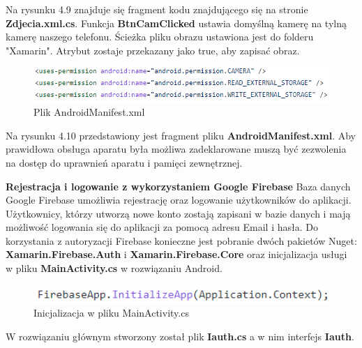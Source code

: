 Na rysunku 4.9 znajduje się fragment kodu znajdującego się na stronie \textbf{Zdjecia.xml.cs}. Funkcja \textbf{BtnCamClicked} ustawia domyślną kamerę na tylną kamerę naszego telefonu. Ścieżka pliku obrazu ustawiona jest do folderu "Xamarin". Atrybut zostaje przekazany jako true, aby zapisać obraz.
  
\begin{figure}[!htb]
	\begin{center}
		\includegraphics[width=12cm]{rys/Zdjecia_manifest.png}
		\caption{Plik AndroidManifest.xml}
		\label{rys:rysunek021}
	\end{center}
\end{figure}  

Na rysunku 4.10 przedstawiony jest fragment pliku \textbf{AndroidManifest.xml}. Aby prawidłowa obsługa aparatu była możliwa zadeklarowane muszą być zezwolenia na dostęp do uprawnień aparatu i pamięci zewnętrznej. \newline \newline

\textbf{Rejestracja i logowanie z wykorzystaniem Google Firebase} \newline
Baza danych Google Firebase umożliwia rejestrację oraz logowanie użytkowników do aplikacji. Użytkownicy, którzy utworzą nowe konto zostają zapisani w bazie danych i mają możliwość logowania się do aplikacji za pomocą adresu Email i hasła. \newline
Do korzystania z autoryzacji Firebase konieczne jest pobranie dwóch pakietów Nuget: \textbf{Xamarin.Firebase.Auth} i \textbf{Xamarin.Firebase.Core} oraz inicjalizacja usługi w pliku \textbf{MainActivity.cs} w rozwiązaniu Android.

\begin{figure}[!htb]
	\begin{center}
		\includegraphics[width=12cm]{rys/firebase_main_activity.png}
		\caption{Inicjalizacja w pliku MainActivity.cs}
		\label{rys:rysunek022}
	\end{center}
\end{figure}

W rozwiązaniu głównym  stworzony został plik \textbf{Iauth.cs} a w nim interfejs \textbf{Iauth}.
 
